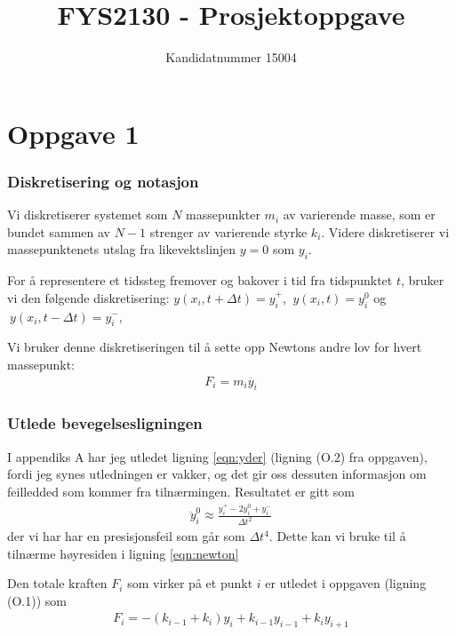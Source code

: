 \documentclass[12p,a4paper]{report}
\begin{document}
\renewcommand{\exp}{\mathrm{e}^}

\title{FYS2130 - Prosjektoppgave}
\author{
		Kandidatnummer 15004
		}
\maketitle
\pagebreak

\setcounter{page}{1}
\section*{Oppgave 1}
\subsubsection*{Diskretisering og notasjon}
Vi diskretiserer systemet som $N$ massepunkter $m_i$ av varierende masse, som er bundet sammen av $N-1$ strenger av varierende styrke $k_i$. Videre diskretiserer vi massepunktenets utslag fra likevektslinjen $y=0$ som $y_i$.

For å representere et tidssteg fremover og bakover i tid fra tidspunktet $t$, bruker vi den følgende diskretisering: $y(x_i,t+\Delta t) = y_i^+$, $\ y(x_i, t) = y_i^0$ og $\ y(x_i, t-\Delta t) = y_i^-$, 

Vi bruker denne diskretiseringen til å sette opp Newtons andre lov for hvert massepunkt:
\begin{align}\label{eqn:newton}
	F_i = m_i\ddot{y_i}
\end{align}

\subsubsection*{Utlede bevegelsesligningen}
I appendiks A har jeg utledet ligning \ref{eqn:yder} (ligning (O.2) fra oppgaven), fordi jeg synes utledningen er vakker, og det gir oss dessuten informasjon om feilledded som kommer fra tilnærmingen. Resultatet er gitt som
\begin{align}\label{eqn:yder}
\ddot{y}_i^0 \approx \frac{y_i^+ - 2y_i^0 + y_i^-}{\Delta t^2}
\end{align}
der vi har har en presisjonsfeil som går som $\Delta t^4$. Dette kan vi bruke til å tilnærme høyresiden i ligning \ref{eqn:newton}

Den totale kraften $F_i$ som virker på et punkt $i$ er utledet i oppgaven (ligning (O.1)) som
\begin{align}\label{eqn:F}
F_i = -(k_{i-1} + k_i)y_i + k_{i-1}y_{i-1} + k_iy_{i+1}
\end{align}
\end{document}
